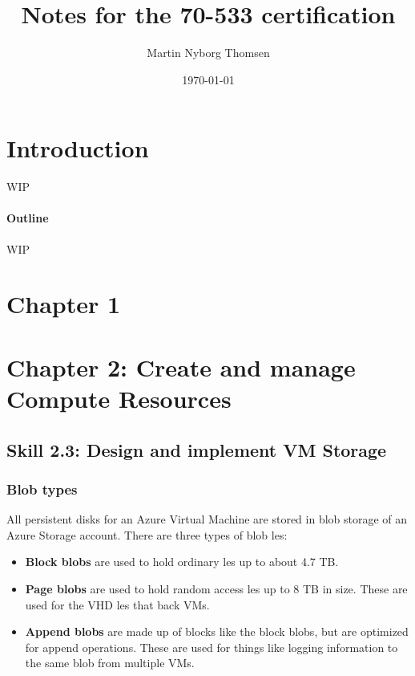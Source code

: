 \documentclass[12pt]{article}
\title{Notes for the 70-533 certification}
\author{Martin Nyborg Thomsen}
\date{\today}
\begin{document}
\maketitle

\section{Introduction}
WIP

\paragraph{Outline}
WIP

\section{Chapter 1}


\section{Chapter 2: Create and manage Compute Resources}

\subsection{Skill 2.3: Design and implement VM Storage}

\subsubsection{Blob types}
All persistent disks for an Azure Virtual Machine are stored in blob storage of an Azure Storage account. There are three types of blob  les:
\begin{itemize}
    \item \textbf{Block blobs} are used to hold ordinary  les up to about 4.7 TB.
    \item \textbf{Page blobs} are used to hold random access  les up to 8 TB in size. These are used for the
    VHD  les that back VMs.
    \item \textbf{Append blobs} are made up of blocks like the block blobs, but are optimized for append operations. These are used for things like logging information to the same blob from multiple VMs.
\end{itemize}
\end{document}
